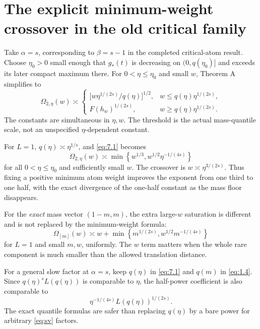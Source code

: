 \section{The explicit minimum-weight crossover in the old critical family}

Take $\alpha=s$, corresponding to $\beta=s-1$ in the completed critical-atom result. Choose $\eta_0>0$ small enough that $g_*(t)$ is decreasing on $(0,q(\eta_0)]$ and exceeds its later compact maximum there. For $0<\eta\le\eta_0$ and small $w$, Theorem A simplifies to
\begin{equation}
  \Omega_{2,\eta}(w)\asymp
  \begin{cases}
    \bigl[w\eta^{1/(2s)}/q(\eta)\bigr]^{1/2},
      &w\le q(\eta)\eta^{1/(2s)},\\
    F(h_w)^{1/(2s)},&w\ge q(\eta)\eta^{1/(2s)}.
  \end{cases}
  \tag{7.1}\label{eq:7.1}
\end{equation}
The constants are simultaneous in $\eta,w$. The threshold is the actual mass-quantile scale, not an unspecified $\eta$-dependent constant.

For $L=1$, $q(\eta)\asymp\eta^{1/s}$, and \eqref{eq:7.1} becomes
\begin{equation}
  \Omega_{2,\eta}(w)\asymp
    \min\!\left\{w^{1/3},w^{1/2}\eta^{-1/(4s)}\right\}
  \tag{7.2}\label{eq:7.2}
\end{equation}
for all $0<\eta\le\eta_0$ and sufficiently small $w$. The crossover is $w\asymp\eta^{3/(2s)}$. Thus fixing a positive minimum atom weight improves the exponent from one third to one half, with the exact divergence of the one-half constant as the mass floor disappears.

For the \emph{exact} mass vector $(1-m,m)$, the extra large-$w$ saturation is different and is not replaced by the minimum-weight formula:
\begin{equation}
  \Omega_{[m]}(w)\asymp
    w+\min\!\left\{m^{1/(2s)},w^{1/2}m^{-1/(4s)}\right\}
  \tag{7.3}\label{eq:7.3}
\end{equation}
for $L=1$ and small $m,w$, uniformly. The $w$ term matters when the whole rare component is much smaller than the allowed translation distance.

For a general slow factor at $\alpha=s$, keep $q(\eta)$ in \eqref{eq:7.1} and $q(m)$ in \eqref{eq:1.4}. Since $q(\eta)^sL(q(\eta))$ is comparable to $\eta$, the half-power coefficient is also comparable to
\begin{equation}
  \eta^{-1/(4s)}L(q(\eta))^{1/(2s)}.
  \tag{7.4}\label{eq:7.4}
\end{equation}
The exact quantile formulas are safer than replacing $q(\eta)$ by a bare power for arbitrary \eqref{eq:sv} factors.

